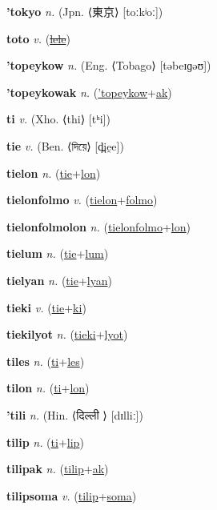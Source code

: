 \textbf{\hypertarget{'tokyo}{'tokyo}} \textit{n.} (Jpn. ⟨{\japanese{}東京}⟩ [toːkʲoː])


\textbf{\hypertarget{toto}{toto}} \textit{v.} (\hyperlink{lele}{\sout{lele}})


\textbf{\hypertarget{'topeykow}{'topeykow}} \textit{n.} (Eng. ⟨Tobago⟩ [təbeɪɡəʊ])


\textbf{\hypertarget{'topeykowak}{'topeykowak}} \textit{n.} (\hyperlink{'topeykow}{'topeykow}+\allowbreak \hyperlink{ak}{ak})


\textbf{\hypertarget{ti}{ti}} \textit{v.} (Xho. ⟨thi⟩ [tʰi])


\textbf{\hypertarget{tie}{tie}} \textit{v.} (Ben. ⟨{\bengali{}দিয়ে}⟩ [d̪ie̯e])


\textbf{\hypertarget{tielon}{tielon}} \textit{n.} (\hyperlink{tie}{tie}+\allowbreak \hyperlink{lon}{lon})


\textbf{\hypertarget{tielonfolmo}{tielonfolmo}} \textit{v.} (\hyperlink{tielon}{tielon}+\allowbreak \hyperlink{folmo}{folmo})


\textbf{\hypertarget{tielonfolmolon}{tielonfolmolon}} \textit{n.} (\hyperlink{tielonfolmo}{tielonfolmo}+\allowbreak \hyperlink{lon}{lon})


\textbf{\hypertarget{tielum}{tielum}} \textit{n.} (\hyperlink{tie}{tie}+\allowbreak \hyperlink{lum}{lum})


\textbf{\hypertarget{tielyan}{tielyan}} \textit{n.} (\hyperlink{tie}{tie}+\allowbreak \hyperlink{lyan}{lyan})


\textbf{\hypertarget{tieki}{tieki}} \textit{v.} (\hyperlink{tie}{tie}+\allowbreak \hyperlink{ki}{ki})


\textbf{\hypertarget{tiekilyot}{tiekilyot}} \textit{n.} (\hyperlink{tieki}{tieki}+\allowbreak \hyperlink{lyot}{lyot})


\textbf{\hypertarget{tiles}{tiles}} \textit{n.} (\hyperlink{ti}{ti}+\allowbreak \hyperlink{les}{les})


\textbf{\hypertarget{tilon}{tilon}} \textit{n.} (\hyperlink{ti}{ti}+\allowbreak \hyperlink{lon}{lon})


\textbf{\hypertarget{'tili}{'tili}} \textit{n.} (Hin. ⟨{\devanagari{}दिल्ली }⟩ [dɪlliː])


\textbf{\hypertarget{tilip}{tilip}} \textit{n.} (\hyperlink{ti}{ti}+\allowbreak \hyperlink{lip}{lip})


\textbf{\hypertarget{tilipak}{tilipak}} \textit{n.} (\hyperlink{tilip}{tilip}+\allowbreak \hyperlink{ak}{ak})


\textbf{\hypertarget{tilipsoma}{tilipsoma}} \textit{v.} (\hyperlink{tilip}{tilip}+\allowbreak \hyperlink{soma}{soma})


